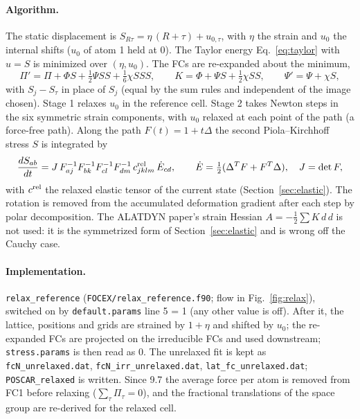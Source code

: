 \documentclass[11pt,a4paper]{article}
\newcommand{\code}[1]{\texttt{#1}}
\begin{document}
\paragraph{Algorithm.} The static displacement is $S_{R\tau}=\eta\,(R+\tau)+u_{0,\tau}$, with $\eta$ the
strain and $u_0$ the internal shifts ($u_0$ of atom 1 held at 0). The Taylor energy
Eq.~\eqref{eq:taylor} with $u=S$ is minimized over $(\eta,u_0)$. The FCs are re-expanded about the minimum,
\begin{equation}
\Pi'=\Pi+\Phi S+\tfrac12\Psi SS+\tfrac16\chi SSS,\qquad K=\Phi+\Psi S+\tfrac12\chi SS,\qquad \Psi'=\Psi+\chi S,
\end{equation}
with $S_j-S_\tau$ in place of $S_j$ (equal by the sum rules and independent of the image chosen). Stage 1
relaxes $u_0$ in the reference cell. Stage 2 takes Newton steps in the six symmetric strain components,
with $u_0$ relaxed at each point of the path (a force-free path). Along the path
$F(t)=1+t\Delta$ the second Piola--Kirchhoff stress $S$ is integrated by
\begin{equation}
\frac{dS_{ab}}{dt}=J\,F^{-1}_{aj}F^{-1}_{bk}F^{-1}_{cl}F^{-1}_{dm}\,c^{\rm rel}_{jklm}\,\dot E_{cd},
\qquad \dot E=\tfrac12(\Delta^TF+F^T\Delta),\quad J=\det F ,
\end{equation}
with $c^{\rm rel}$ the relaxed elastic tensor of the current state (Section~\ref{sec:elastic}). The rotation
is removed from the accumulated deformation gradient after each step by polar decomposition. The ALATDYN
paper's strain Hessian $A=-\tfrac12\sum K\,d\,d$ is not used: it is the symmetrized form of
Section~\ref{sec:elastic} and is wrong off the Cauchy case.

\paragraph{Implementation.} \code{relax\_reference} (\code{FOCEX/relax\_reference.f90}; flow in Fig.~\ref{fig:relax}), switched on by
\code{default.params} line 5 = 1 (any other value is off). After it, the lattice, positions and grids are
strained by $1+\eta$ and shifted by $u_0$; the re-expanded FCs are projected on the irreducible FCs and used
downstream; \code{stress.params} is then read as 0. The unrelaxed fit is kept as \code{fcN\_unrelaxed.dat},
\code{fcN\_irr\_unrelaxed.dat}, \code{lat\_fc\_unrelaxed.dat}; \code{POSCAR\_relaxed} is written. Since 9.7
the average force per atom is removed from FC1 before relaxing ($\sum_\tau\Pi_\tau=0$), and the fractional
translations of the space group are re-derived for the relaxed cell.
\end{document}
